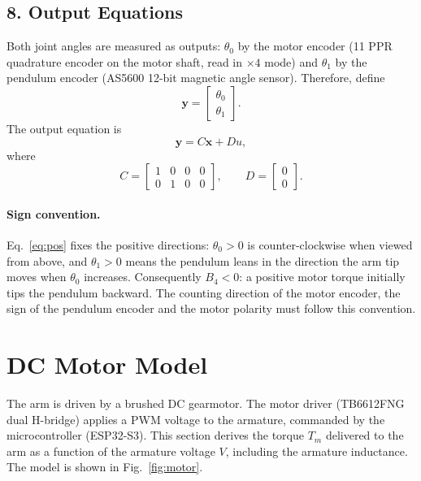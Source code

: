 \documentclass[a4paper,11pt]{article}
\begin{document}
\subsection{8. Output Equations}
Both joint angles are measured as outputs: $\theta_0$ by the motor encoder (11 PPR quadrature encoder on the motor shaft, read in $\times4$ mode) and $\theta_1$ by the pendulum encoder (AS5600 12-bit magnetic angle sensor). Therefore, define
\begin{equation}
  \mathbf{y} = \begin{bmatrix} \theta_0 \\ \theta_1 \end{bmatrix}.
\end{equation}
The output equation is
\begin{equation}
  \mathbf{y} = C\mathbf{x} + Du ,
\end{equation}
where
\begin{equation}
  C = \begin{bmatrix} 1 & 0 & 0 & 0 \\ 0 & 1 & 0 & 0 \end{bmatrix}, \qquad
  D = \begin{bmatrix} 0 \\ 0 \end{bmatrix}.
\end{equation}

\paragraph{Sign convention.} Eq.~\eqref{eq:pos} fixes the positive directions: $\theta_0 > 0$ is counter-clockwise when viewed from above, and $\theta_1 > 0$ means the pendulum leans in the direction the arm tip moves when $\theta_0$ increases. Consequently $B_4 < 0$: a positive motor torque initially tips the pendulum backward. The counting direction of the motor encoder, the sign of the pendulum encoder and the motor polarity must follow this convention.

\section{DC Motor Model}
\label{sec:motor}
The arm is driven by a brushed DC gearmotor. The motor driver (TB6612FNG dual H-bridge) applies a PWM voltage to the armature, commanded by the microcontroller (ESP32-S3). This section derives the torque $T_m$ delivered to the arm as a function of the armature voltage $V$, including the armature inductance. The model is shown in Fig.~\ref{fig:motor}.
\end{document}
